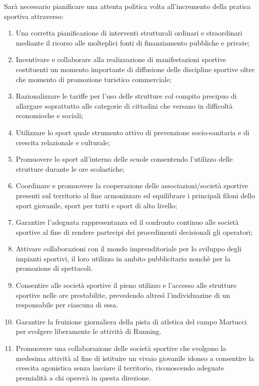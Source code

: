 \documentclass[a4paper,14pt,italian]{sphinxmanual}
\begin{document}
Sarà necessario pianificare una attenta politica volta all’incremento della pratica sportiva attraverso:
\begin{enumerate}
\def\theenumi{\arabic{enumi}}
\def\labelenumi{\theenumi .}
\makeatletter\def\p@enumii{\p@enumi \theenumi .}\makeatother
\item {} 
Una corretta pianificazione di interventi strutturali ordinari e straordinari mediante il ricorso alle molteplici fonti di finanziamento pubbliche e private;

\item {} 
Incentivare e collaborare alla realizzazione di manifestazioni sportive costituenti un momento importante di diffusione delle discipline sportive oltre che momento di promozione turistico commerciale;

\item {} 
Razionalizzare le tariffe per l’uso delle strutture col compito precipuo di allargare soprattutto alle categorie di cittadini che versano in difficoltà economioche e sociali;

\item {} 
Utilizzare lo sport quale strumento attivo di prevenzione socio-sanitaria e di crescita relazionale e culturale;

\item {} 
Promuovere lo sport all’interno delle scuole consentendo l’utilizzo delle strutture durante le ore scolastiche;

\item {} 
Coordinare e promuovere la cooperazione delle associazioni/società sportive presenti sul territorio al fine armonizzare ed equilibrare i principali filoni dello sport giovanile, sport per tutti e sport di alto livello;

\item {} 
Garantire l’adeguata rappresentanza ed il confronto continuo alle società sportive al fine di rendere partecipi dei procedimenti decisionali gli operatori;

\item {} 
Attivare collaborazioni con il mondo imprenditoriale per lo sviluppo degli impianti sportivi, il loro utilizzo in ambito pubblicitario nonchè per la promozione di spettacoli.

\item {} 
Consentire alle società sportive il pieno utilizzo e l’accesso alle strutture sportive nelle ore prestabilite, prevedendo altresì l’individuazine di un responsabile per ciascuna di essa.

\item {} 
Garantire la fruizione giornaliera della pista di atletica del campo Martucci per svolgere liberamente le attività di Running.

\item {} 
Promuovere una collaborazione delle società sportive che svolgono la medesima attività al fine di istituire un vivaio giovanile idoneo a consentire la crescita agonistica senza lasciare il territorio, riconoscendo adeguate premialità a chi opererà in questa direzione.

\end{enumerate}
\end{document}

